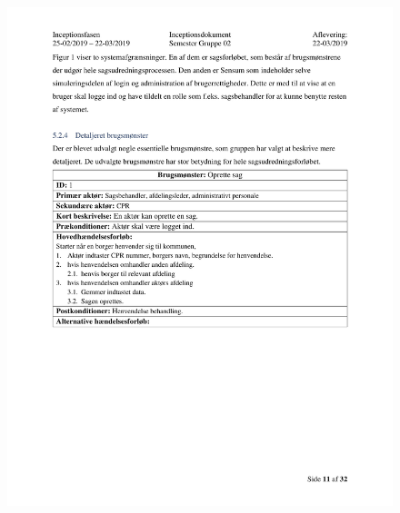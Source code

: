 \begin{figure}[hb]
  \includegraphics[scale = 0.33]{./PNG/Inceptions/Gruppe02+InceptionsDokument-12.jpg} 
\end{figure}

